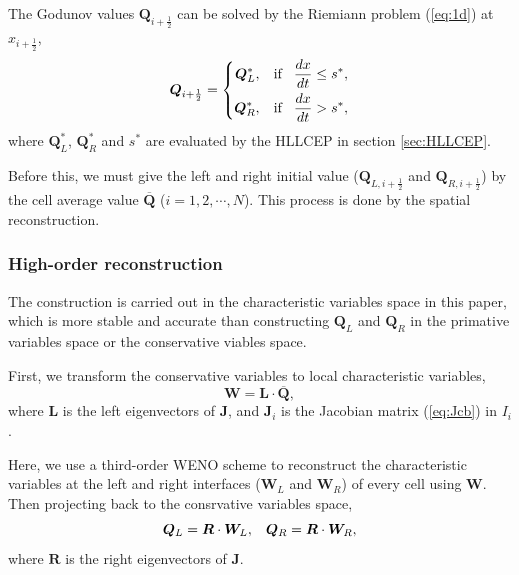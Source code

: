 \documentclass{article}
\numberwithin{equation}{section}
\numberwithin{table}{section}
\begin{document}
The Godunov values  $\bm{Q}_{i+\frac{1}{2}}$  can be solved  by the Riemiann problem  (\ref{eq:1d}) at $x_{i+\frac{1}{2}}$,
\begin{equation}
  \bm{Q}_{i+\frac{1}{2}} = \left\{ \begin{aligned}
	\bm{Q}_L^*, \hspace{0.3cm} \text{if} \hspace{0.3cm} \frac{dx}{dt} \le  s^*,\\
	\bm{Q}_R^*, \hspace{0.3cm} \text{if} \hspace{0.3cm} \frac{dx}{dt} > s^*,\\
  \end{aligned} \right.
\end{equation}
where $\bm{Q}_L^*$, $\bm{Q}_R^*$ and $s^*$ are evaluated by the HLLCEP in section \ref{sec:HLLCEP}.

Before this, we must give the left  and right initial value ($\bm{Q}_{L,i+\frac{1}{2}}$ and $\bm{Q}_{R,i+\frac{1}{2}}$) by the cell average value $\overline{\bm{Q}}$ ($i = 1,2,\cdots,N$). This process is done by the spatial reconstruction.

\subsubsection{High-order reconstruction}
The construction is carried out in the characteristic variables  space in this paper, which is   more stable  and accurate  than constructing  $\bm{Q}_L$ and $\bm{Q}_R$ in the primative variables space or the conservative viables space.

First, we transform the conservative variables to local characteristic variables,
\begin{equation}
  \bm{W} = \bm{L} \cdot \overline{\bm{Q}},
\end{equation}
where $\bm{L}$ is the left eigenvectors of $\bm{J}$, and $\bm{J}_i$ is the Jacobian matrix  (\ref{eq:Jcb}) in $I_i$.

Here, we  use a third-order WENO scheme to reconstruct the characteristic variables at the  left and right interfaces ($\bm{W}_L$ and $\bm{W}_R$)  of every cell using  $\bm{W}$. Then projecting  back to the consrvative variables space,
\begin{equation}
  \bm{Q}_L = \bm{R} \cdot \bm{W}_L, \hspace{0.3cm}   \bm{Q}_R = \bm{R} \cdot \bm{W}_R,
\end{equation}
where $\bm{R}$ is the right eigenvectors of $\bm{J}$.
\end{document}
